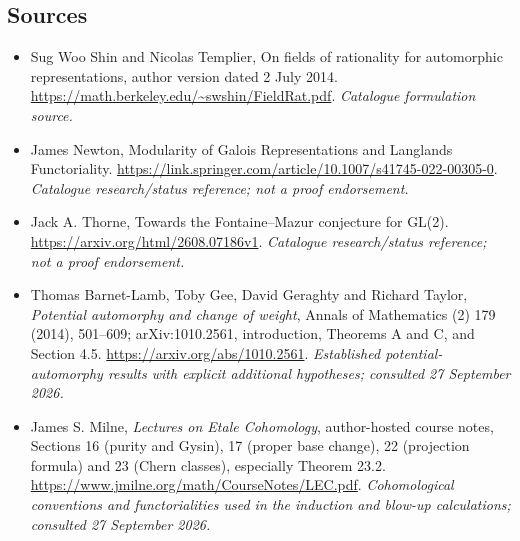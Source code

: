 \documentclass[11pt,a4paper]{article}
\numberwithin{equation}{section}
\begin{document}
\subsection{Sources}
\begin{itemize}\raggedright
\item[\textnormal{[S1]}]\hypertarget{source:9400048:1}{} Sug Woo Shin and Nicolas Templier, On fields of rationality for automorphic representations, author version dated 2 July 2014.
\url{https://math.berkeley.edu/~swshin/FieldRat.pdf}.
{\small\textit{Catalogue formulation source.}}
\item[\textnormal{[S2]}]\hypertarget{source:9400048:2}{} James Newton, Modularity of Galois Representations and Langlands Functoriality.
\url{https://link.springer.com/article/10.1007/s41745-022-00305-0}.
{\small\textit{Catalogue research/status reference; not a proof endorsement.}}
\item[\textnormal{[S3]}]\hypertarget{source:9400048:3}{} Jack A. Thorne, Towards the Fontaine–Mazur conjecture for GL(2).
\url{https://arxiv.org/html/2608.07186v1}.
{\small\textit{Catalogue research/status reference; not a proof endorsement.}}
\item[\textnormal{[E1]}]\hypertarget{extra:9400048:1}{} Thomas Barnet-Lamb,
Toby Gee, David Geraghty and Richard Taylor, \emph{Potential automorphy and
change of weight}, Annals of Mathematics (2) 179 (2014), 501--609;
arXiv:1010.2561, introduction, Theorems A and C, and Section 4.5.
\url{https://arxiv.org/abs/1010.2561}.
{\small\textit{Established potential-automorphy results with explicit
additional hypotheses; consulted 27 September 2026.}}
\item[\textnormal{[E2]}]\hypertarget{extra:9400048:2}{} James S. Milne,
\emph{Lectures on Etale Cohomology}, author-hosted course notes,
Sections 16 (purity and Gysin), 17 (proper base change), 22 (projection
formula) and 23 (Chern classes), especially Theorem 23.2.
\url{https://www.jmilne.org/math/CourseNotes/LEC.pdf}.
{\small\textit{Cohomological conventions and functorialities used in the
induction and blow-up calculations; consulted 27 September 2026.}}
\end{itemize}
\end{document}
